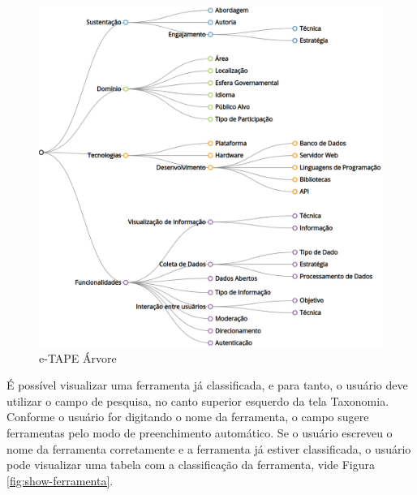 \begin{figure}[!ht]
    \centering
    \includegraphics[scale=0.20]{./figuras/taxonopart-horizontal.png}
    \caption{e-TAPE Árvore}
    \label{fig:e-tapeArvore}
\end{figure}
\newpage

\par
É possível visualizar uma ferramenta já classificada, e para tanto, o usuário deve utilizar o campo de pesquisa, no canto superior esquerdo da tela Taxonomia.
Conforme o usuário for digitando o nome da ferramenta, o campo sugere ferramentas pelo modo de preenchimento automático. Se o usuário escreveu o nome da ferramenta corretamente 
e a ferramenta já estiver classificada, o usuário pode visualizar uma tabela com a classificação da 
ferramenta, vide Figura \ref{fig:show-ferramenta}.

\vspace{0.5cm}

